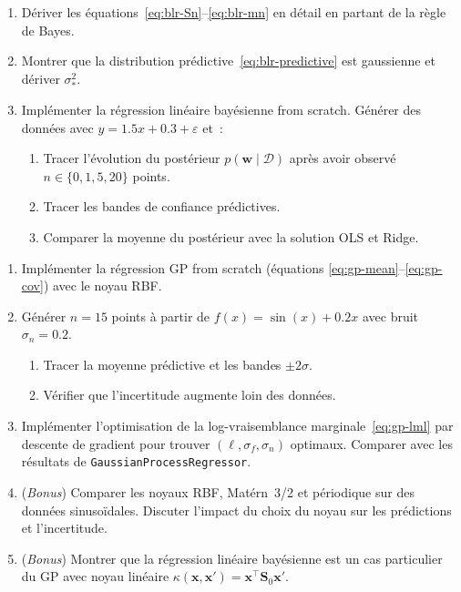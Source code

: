 \begin{exercice}
\begin{enumerate}
  \item D\'eriver les \'equations~\eqref{eq:blr-Sn}--\eqref{eq:blr-mn} en
    d\'etail en partant de la r\`egle de Bayes.
  \item Montrer que la distribution pr\'edictive~\eqref{eq:blr-predictive} est
    gaussienne et d\'eriver $\sigma_*^2$.
  \item Impl\'ementer la r\'egression lin\'eaire bay\'esienne from scratch.
    G\'en\'erer des donn\'ees avec $y = 1.5x + 0.3 + \varepsilon$ et~:
    \begin{enumerate}
      \item Tracer l'\'evolution du post\'erieur $p(\bm{w} \mid \mathcal{D})$
        apr\`es avoir observ\'e $n \in \{0, 1, 5, 20\}$ points.
      \item Tracer les bandes de confiance pr\'edictives.
      \item Comparer la moyenne du post\'erieur avec la solution OLS et Ridge.
    \end{enumerate}
\end{enumerate}
\end{exercice}

\begin{exercice}
\begin{enumerate}
  \item Impl\'ementer la r\'egression GP from scratch (\'equations
    \eqref{eq:gp-mean}--\eqref{eq:gp-cov}) avec le noyau RBF.
  \item G\'en\'erer $n = 15$ points \`a partir de $f(x) = \sin(x) +
    0.2x$ avec bruit $\sigma_n = 0.2$.
    \begin{enumerate}
      \item Tracer la moyenne pr\'edictive et les bandes $\pm 2\sigma$.
      \item V\'erifier que l'incertitude augmente loin des donn\'ees.
    \end{enumerate}
  \item Impl\'ementer l'optimisation de la log-vraisemblance
    marginale~\eqref{eq:gp-lml} par descente de gradient pour trouver
    $(\ell, \sigma_f, \sigma_n)$ optimaux. Comparer avec les r\'esultats de
    \texttt{GaussianProcessRegressor}.
  \item (\emph{Bonus}) Comparer les noyaux RBF, Mat\'ern~3/2 et p\'eriodique
    sur des donn\'ees sinuso\"idales. Discuter l'impact du choix du noyau sur
    les pr\'edictions et l'incertitude.
  \item (\emph{Bonus}) Montrer que la r\'egression lin\'eaire bay\'esienne est
    un cas particulier du GP avec noyau lin\'eaire
    $\kappa(\bm{x}, \bm{x}') = \bm{x}^\top \bm{S}_0 \bm{x}'$.
\end{enumerate}
\end{exercice}
